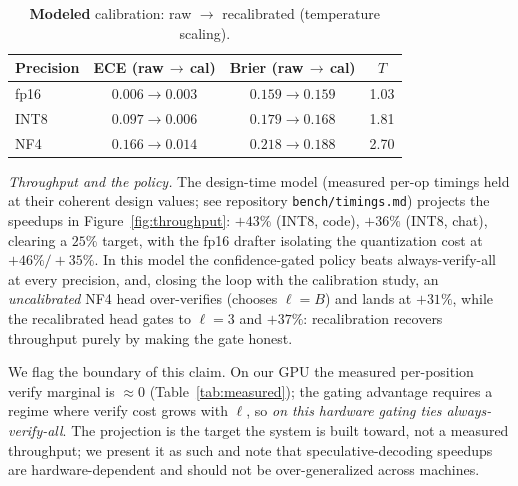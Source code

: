 \documentclass[11pt]{article}
\theoremstyle{plain}
\theoremstyle{definition}
\begin{document}
\begin{table}[t]
\centering\small
\caption{\textbf{Modeled} calibration: raw $\to$ recalibrated (temperature
scaling).}
\label{tab:calib}
\begin{tabular}{lccc}
\toprule
Precision & ECE (raw\,$\to$\,cal) & Brier (raw\,$\to$\,cal) & $T$ \\
\midrule
fp16 & $0.006 \to 0.003$ & $0.159 \to 0.159$ & 1.03 \\
INT8 & $0.097 \to 0.006$ & $0.179 \to 0.168$ & 1.81 \\
NF4  & $0.166 \to 0.014$ & $0.218 \to 0.188$ & 2.70 \\
\bottomrule
\end{tabular}
\end{table}

\emph{Throughput and the policy.} The design-time model (measured per-op timings
held at their coherent design values; see repository \texttt{bench/timings.md})
projects the speedups in Figure~\ref{fig:throughput}: $+43\%$ (INT8, code),
$+36\%$ (INT8, chat), clearing a $25\%$ target, with the fp16 drafter isolating
the quantization cost at $+46\%/{+}35\%$. In this model the confidence-gated
policy beats always-verify-all at every precision, and, closing the loop with the
calibration study, an \emph{uncalibrated} NF4 head over-verifies (chooses
$\ell{=}B$) and lands at $+31\%$, while the recalibrated head gates to $\ell{=}3$
and $+37\%$: recalibration recovers throughput purely by making the gate honest.

We flag the boundary of this claim. On our GPU the measured per-position verify
marginal is $\approx0$ (Table~\ref{tab:measured}); the gating advantage requires a
regime where verify cost grows with $\ell$, so \emph{on this hardware gating ties
always-verify-all}. The projection is the target the system is built toward, not a
measured throughput; we present it as such and note that speculative-decoding
speedups are hardware-dependent and should not be over-generalized across
machines.
\end{document}
